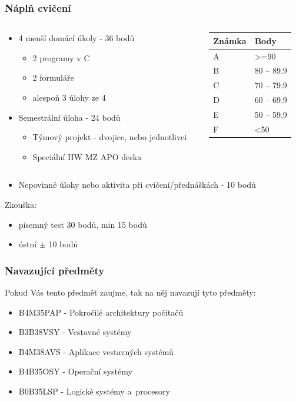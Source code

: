 \documentclass{beamer}
\begin{document}
\begin{frame}
\frametitle{Náplň cvičení}

\begin{columns}
\begin{column}{0.6\textwidth}
\begin{itemize}
\item 4 menší domácí úkoly - 36 bodů
\begin{itemize}
\item 2 programy v C
\item 2 formuláře
\item alespoň 3 úlohy ze 4
\end{itemize}
\item Semestrální úloha - 24 bodů
\begin{itemize}
\item Týmový projekt - dvojice, nebo jednotlivci
\item Speciální HW MZ APO deska
\end{itemize}
\end{itemize}
\end{column}
\begin{column}{0.35\textwidth}  
   \begin{tabular}{|l|l|}\hline
   Známka & Body\\ \hline
   A & >=90\\ \hline
   B & 80 -- 89.9\\ \hline
   C & 70 -- 79.9\\ \hline
   D & 60 -- 69.9\\ \hline
   E & 50 -- 59.9\\ \hline
   F & <50\\ \hline
   \end{tabular}
\end{column}
\end{columns}
\begin{itemize}
\item Nepovinné úlohy nebo aktivita při cvičení/přednáškách - 10 bodů
\end{itemize}
\bigskip
Zkouška: 
\begin{itemize}
\item písemný test 30 bodů, min 15 bodů
\item ústní $\pm$ 10 bodů    
\end{itemize}

\end{frame}


\begin{frame}
\frametitle{Navazující předměty}
Pokud Vás tento předmět zaujme, tak na něj navazují tyto předměty:
\begin{itemize}
\item B4M35PAP - Pokročilé architektury počítačů
\item B3B38VSY - Vestavné systémy
\item B4M38AVS - Aplikace vestavných systémů
\item B4B35OSY - Operační systémy
\item B0B35LSP - Logické systémy a procesory
\end{itemize}
\end{frame}
\end{document}
